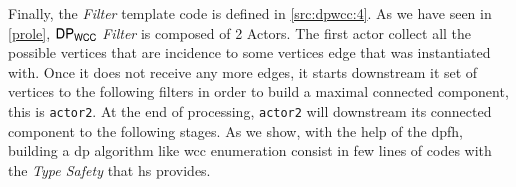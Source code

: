 Finally, the \textit{Filter} template code is defined in \autoref{src:dpwcc:4}. 
As we have seen in \autoref{prole}, $\mathsf{DP_{WCC}}$ \textit{Filter} is composed of 2 Actors. The first actor collect all the possible vertices that are incidence to some vertices edge that was instantiated with.
Once it does not receive any more edges, it starts downstream it set of vertices to the following filters in order to build a maximal connected component, this is \texttt{actor2}. At the end of processing, \texttt{actor2} will downstream its connected component to the following stages.
As we show, with the help of the \acrlong{dpfh}, building a \acrshort{dp} algorithm like \acrshort{wcc} enumeration consist in few lines of codes with the \textit{Type Safety} that \acrshort{hs} provides.

